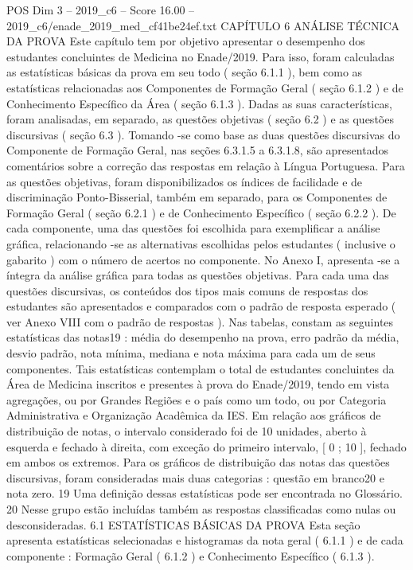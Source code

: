 \begin{textsample}{POS Dim 3 – 2019\_c6 – Score 16.00 – 2019\_c6/enade\_2019\_med\_cf41be24ef.txt}  \label{ex:f3_pos_020}
CAPÍTULO 6 ANÁLISE TÉCNICA DA PROVA Este capítulo tem por objetivo apresentar o desempenho dos estudantes concluintes de Medicina no Enade/2019.
Para isso, foram calculadas as estatísticas básicas da prova em seu todo ( seção 6.1.1 ), bem como as estatísticas relacionadas aos Componentes de Formação Geral ( seção 6.1.2 ) e de Conhecimento Específico da Área ( seção 6.1.3 ).
Dadas as suas características, foram analisadas, em separado, as questões objetivas ( seção 6.2 ) e as questões discursivas ( seção 6.3 ).
Tomando -se como base as duas questões discursivas do Componente de Formação Geral, nas seções 6.3.1.5 a 6.3.1.8, são apresentados comentários sobre a correção das respostas em relação à Língua Portuguesa.
Para as questões objetivas, foram disponibilizados os índices de facilidade e de discriminação Ponto-Bisserial, também em separado, para os Componentes de Formação Geral ( seção 6.2.1 ) e de Conhecimento Específico ( seção 6.2.2 ).
De cada componente, uma das questões foi escolhida para exemplificar a análise gráfica, relacionando -se as alternativas escolhidas pelos estudantes ( inclusive o gabarito ) com o número de acertos no componente.
No Anexo I, apresenta -se a íntegra da análise gráfica para todas as questões objetivas.
Para cada uma das questões discursivas, os conteúdos dos tipos mais comuns de respostas dos estudantes são apresentados e comparados com o padrão de resposta esperado ( ver Anexo VIII com o padrão de respostas ).
Nas tabelas, constam as seguintes estatísticas das notas19 : média do desempenho na prova, erro padrão da média, desvio padrão, nota mínima, mediana e nota máxima para cada um de seus componentes.
Tais estatísticas contemplam o total de estudantes concluintes da Área de Medicina inscritos e presentes à prova do Enade/2019, tendo em vista agregações, ou por Grandes Regiões e o país como um todo, ou por Categoria Administrativa e Organização Acadêmica da IES.
Em relação aos gráficos de distribuição de notas, o intervalo considerado foi de 10 unidades, aberto à esquerda e fechado à direita, com exceção do primeiro intervalo, [ 0 ; 10 ], fechado em ambos os extremos.
Para os gráficos de distribuição das notas das questões discursivas, foram consideradas mais duas categorias : questão em branco20 e nota zero. 19 Uma definição dessas estatísticas pode ser encontrada no Glossário. 20 Nesse grupo estão incluídas também as respostas classificadas como nulas ou desconsideradas. 6.1 ESTATÍSTICAS BÁSICAS DA PROVA Esta seção apresenta estatísticas selecionadas e histogramas da nota geral ( 6.1.1 ) e de cada componente : Formação Geral ( 6.1.2 ) e Conhecimento Específico ( 6.1.3 ).

\end{textsample}
